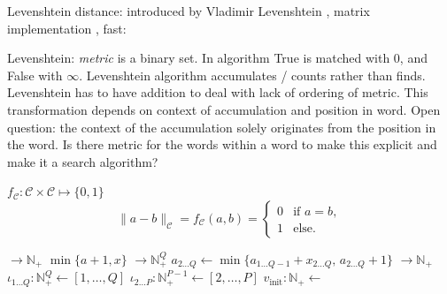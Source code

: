 Levenshtein distance: introduced by Vladimir Levenshtein \citep{levenshtein65}, matrix implementation \citep{wagner74}, fast: \citep{hirschberg75}

Levenshtein: \textit{metric} is a binary set. In algorithm True is matched with $0$, and False with $\infty$. Levenshtein algorithm accumulates / counts rather than finds. Levenshtein has to have addition to deal with lack of ordering of metric. This transformation depends on context of accumulation and position in word. Open question: the context of the accumulation solely originates from the position in the word. Is there metric for the words within a word to make this explicit and make it a search algorithm?


$f_\mathcal{C}: \mathcal{C} \times \mathcal{C} \mapsto \{0, 1 \}$
\begin{equation}
    \label{eq:levenshtein_metric}
    \| a - b \|_\mathcal{C} = f_\mathcal{C}(a, b) = \begin{cases}
        0 & \text{if } a = b, \\
        1 & \text{else.}
    \end{cases}
\end{equation}

\begin{algorithm}
    \caption{Algorithm that maps a given distance matrix $d_{ij} = [p_i \neq q_j]$, where $[ \bullet ]$ is the Iverson bracket~\citep{knuth92}, to the Levenshtein distance of the character sequences $p \in \mathcal{C}^P$ and $q \in \mathcal{C}^Q$.}
    \begin{algorithmic}[1]
         $\to \mathbb{N}_+$
            \State \Return $\min\{ a + 1, x \}$
        \EndFunction
        \Statex
         $\to \mathbb{N}_+^Q$
            \State $a_{2 \ldots Q} \gets \min\{a_{1 \ldots Q-1} + x_{2 \ldots Q},\, a_{2 \ldots Q} + 1 \}$
            \State \Return {}
        \EndFunction
        \Statex
         $\to \mathbb{N}_+$
            \State $\iota_{1 \ldots Q}: \mathbb{N}_+^{Q} \gets [1, \ldots, Q]$
            \State $\iota_{2 \ldots P}: \mathbb{N}_+^{P-1} \gets [2, \ldots, P]$
            \Statex
            \State $v_\mathrm{init}: \mathbb{N}_+ \gets$ 
            \State \Return {}
        \EndFunction
    \end{algorithmic}
\end{algorithm}

